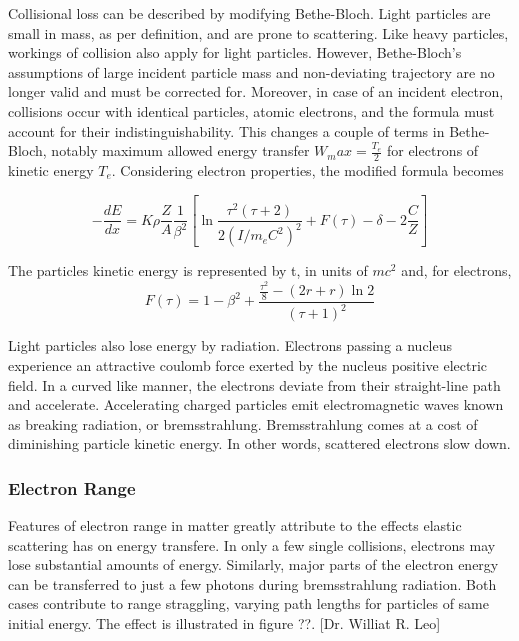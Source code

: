 Collisional loss can be described by modifying Bethe-Bloch. Light particles are small in mass, as per definition, and are prone to scattering. Like heavy particles, workings of collision also apply for light particles. However, Bethe-Bloch’s assumptions of large incident particle mass and non-deviating trajectory are no longer valid and must be corrected for. Moreover, in case of an incident electron, collisions occur with identical particles, atomic electrons, and the formula must account for their indistinguishability. This changes a couple of terms in Bethe-Bloch, notably maximum allowed energy transfer $W_max = \frac{T_e}{2}$ for electrons of kinetic energy $T_e$. Considering electron properties, the modified formula becomes

    \begin{equation}
        - \frac{dE}{dx} = K \rho \frac{Z}{A} \frac{1}{\beta^2}
                          \left[
                          \ln{\frac{\tau^2(\tau+2)}{2(I/m_eC^2)^2}}+F(\tau) - \delta-2\frac{C}{Z}
                          \right]
    \end{equation}

The particles kinetic energy is represented by t, in units of $mc^2$ and, for electrons,
    \begin{equation}
      F(\tau) = 1- \beta^2+\frac{\frac{\tau^2}{8}-(2r+r)\ln{2} }{(\tau+1)^2}
    \end{equation}

Light particles also lose energy by radiation. Electrons passing a nucleus experience an attractive coulomb force exerted by the nucleus positive electric field. In a curved like manner, the electrons deviate from their straight-line path and accelerate. Accelerating charged particles emit electromagnetic waves known as breaking radiation, or bremsstrahlung. Bremsstrahlung comes at a cost of diminishing particle kinetic energy. In other words, scattered electrons slow down.


\subsubsection{Electron Range}
Features of electron range in matter greatly attribute to the effects elastic scattering has on energy transfere. In only a few single collisions, electrons may lose substantial amounts of energy. Similarly, major parts of the electron energy can be transferred to just a few photons during bremsstrahlung radiation. Both cases contribute to range straggling, varying path lengths for particles of same initial energy. The effect is illustrated in figure ??. [Dr. Williat R. Leo]

